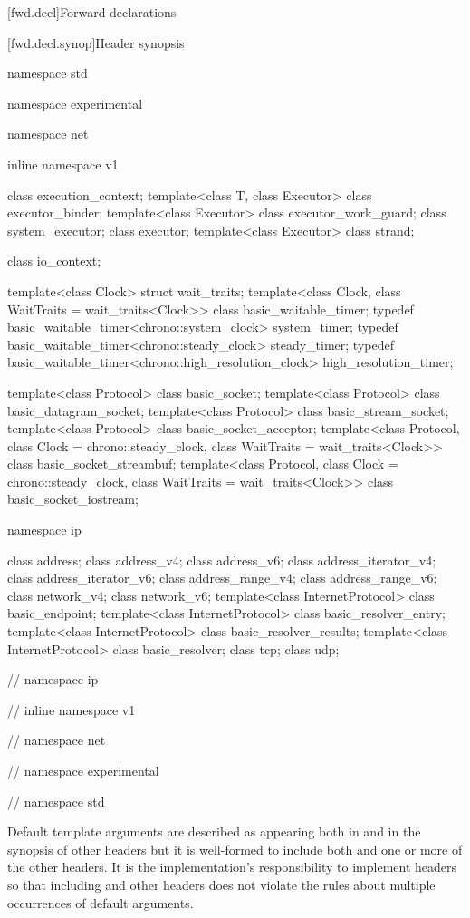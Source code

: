 
[fwd.decl]{Forward declarations}


[fwd.decl.synop]{Header  synopsis}

\begin{codeblock}
namespace std {
namespace experimental {
namespace net {
inline namespace v1 {

  class execution_context;
  template<class T, class Executor>
    class executor_binder;
  template<class Executor>
    class executor_work_guard;
  class system_executor;
  class executor;
  template<class Executor>
    class strand;

  class io_context;

  template<class Clock> struct wait_traits;
  template<class Clock, class WaitTraits = wait_traits<Clock>>
    class basic_waitable_timer;
  typedef basic_waitable_timer<chrono::system_clock> system_timer;
  typedef basic_waitable_timer<chrono::steady_clock> steady_timer;
  typedef basic_waitable_timer<chrono::high_resolution_clock> high_resolution_timer;

  template<class Protocol>
    class basic_socket;
  template<class Protocol>
    class basic_datagram_socket;
  template<class Protocol>
    class basic_stream_socket;
  template<class Protocol>
    class basic_socket_acceptor;
  template<class Protocol, class Clock = chrono::steady_clock,
    class WaitTraits = wait_traits<Clock>>
      class basic_socket_streambuf;
  template<class Protocol, class Clock = chrono::steady_clock,
    class WaitTraits = wait_traits<Clock>>
      class basic_socket_iostream;

  namespace ip {

    class address;
    class address_v4;
    class address_v6;
    class address_iterator_v4;
    class address_iterator_v6;
    class address_range_v4;
    class address_range_v6;
    class network_v4;
    class network_v6;
    template<class InternetProtocol>
      class basic_endpoint;
    template<class InternetProtocol>
      class basic_resolver_entry;
    template<class InternetProtocol>
      class basic_resolver_results;
    template<class InternetProtocol>
      class basic_resolver;
    class tcp;
    class udp;

  } // namespace ip
} // inline namespace v1
} // namespace net
} // namespace experimental
} // namespace std
\end{codeblock}

\pnum
Default template arguments are described as appearing both in  and in the synopsis of other headers but it is well-formed to include both  and one or more of the other headers. \enternote It is the implementation’s responsibility to implement headers so that including  and other headers does not violate the rules about multiple occurrences of default arguments. \exitnote



